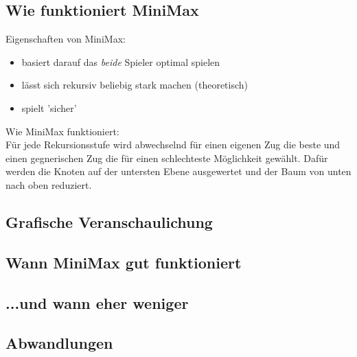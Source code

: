 \documentclass[12pt, draft]{beamer}
\begin{document}
\subsection{Wie funktioniert MiniMax}
\begin{frame}
	Eigenschaften von MiniMax:
	\begin{itemize}
		\item basiert darauf das \emph{beide} Spieler optimal spielen
		\item lässt sich rekursiv beliebig stark machen (theoretisch)
		\item spielt 'sicher'
	\end{itemize}
	Wie MiniMax funktioniert:\\
	Für jede Rekursionsstufe wird abwechselnd für einen eigenen Zug die beste und einen gegnerischen Zug die für einen schlechteste Möglichkeit gewählt. Dafür werden die Knoten auf der untersten Ebene ausgewertet und der Baum von unten nach oben reduziert.\\
\end{frame}

\subsection{Grafische Veranschaulichung}
\begin{frame}
\end{frame}

\subsection{Wann MiniMax gut funktioniert}
\begin{frame}
\end{frame}
\subsection{...und wann eher weniger}
\begin{frame}
\end{frame}
\subsection{Abwandlungen}
\begin{frame}
\end{frame}
\end{document}
